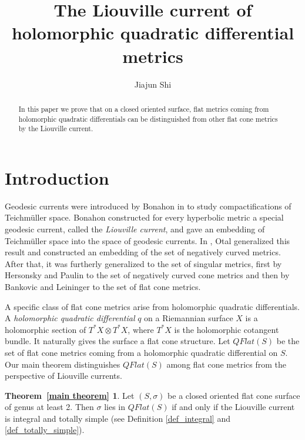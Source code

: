 \documentclass[reqno]{amsart}
\theoremstyle{plain}
\theoremstyle{definition}
\theoremstyle{remark}
\theoremstyle{definition}
\newcommand{\?}{\textcolor{red}{?}}
\newtheorem*{thmmain}{Theorem~\ref{main theorem}}
\begin{document}
\title[Liouville current of quadratic differential metrics]{The Liouville current of holomorphic quadratic differential metrics}
\author{Jiajun Shi}
\address{Mathematisches Institut, Ruprecht-Karls Universität Heidelberg, 69120 Heidelberg, Germany}

\begin{abstract}
    In this paper we prove that on a closed oriented surface, flat metrics coming from holomorphic quadratic differentials can be distinguished from other flat cone metrics by the Liouville current.
\end{abstract}

\maketitle

\section{Introduction}

Geodesic currents were introduced by Bonahon in \cite{bonahon1988geometry} to study compactifications of Teichmüller space. Bonahon constructed for every hyperbolic metric a special geodesic current, called the \textit{Liouville current}, and gave an embedding of Teichmüller space into the space of geodesic currents. In \cite{otal1990spectre}, Otal generalized this result and constructed an embedding of the set of negatively curved metrics. After that, it was furtherly generalized to the set of singular metrics, first by Hersonsky and Paulin \cite{hersonsky1997rigidity} to the set of negatively curved cone metrics and then by Bankovic and Leininger \cite{bankovic2018marked} to the set of flat cone metrics. 

A specific class of flat cone metrics arise from holomorphic quadratic differentials. A \textit{holomorphic quadratic differential} $q$ on a Riemannian surface $X$ is a holomorphic section of $T^*X\otimes T^*X$, where $T^*X$ is the holomorphic cotangent bundle. It naturally gives the surface a flat cone structure. Let $QFlat(S)$ be the set of flat cone metrics coming from a holomorphic quadratic differential on $S$. Our main theorem distinguishes $QFlat(S)$ among flat cone metrics from the perspective of Liouville currents.
\begin{thmmain}
Let $(S,\sigma)$ be a closed oriented flat cone surface of genus at least 2. Then $\sigma$ lies in $QFlat(S)$ if and only if the Liouville current is integral and totally simple (see Definition \ref{def_integral} and \ref{def_totally_simple}).
\end{thmmain}
\end{document}
